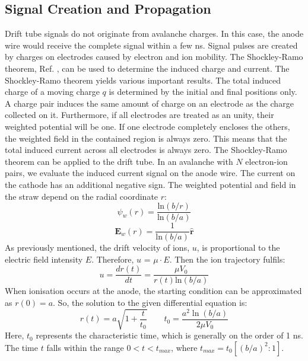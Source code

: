 \subsection{Signal Creation and Propagation}
Drift tube signals do not originate from avalanche charges. In this case, the anode wire would 
receive the complete signal within a few ns. Signal pulses are created by charges on electrodes 
caused by electron and ion mobility. The Shockley-Ramo theorem, Ref. \cite{kola}, can be 
used to determine the induced charge and current. 
The Shockley-Ramo theorem yields various important results. The total induced charge of a moving charge 
$q$ is determined by the initial and final positions only.  A charge pair induces the same amount of 
charge on an electrode as the charge collected on it. Furthermore, if all electrodes are treated as 
an unity, their weighted potential will be one. 
If one electrode completely encloses the others, the weighted field in the contained region is always zero. 
This means that the total induced current across all electrodes is always zero. The Shockley-Ramo theorem can 
be applied to the drift tube. In an avalanche with $N$ electron-ion pairs, we evaluate the induced current 
signal on the anode wire. The current on the cathode has an additional negative sign. The weighted 
potential and field in the straw depend on the radial coordinate $r$:
\begin{equation}
    \psi_w(r)=\frac{\text{ln}(b/r)}{\text{ln}(b/a)}
\end{equation}
\begin{equation}
    \textbf{E}_w(r)=\frac{1}{\text{ln}(b/a)}\hat{\textbf{r}}
\end{equation}
As previously mentioned, the drift velocity of ions, $u$, is proportional to the electric field intensity $E$. Therefore, $u$ = $\mu \cdot E$. 
Then the ion trajectory fulfils:
\begin{equation}
    u=\frac{dr(t)}{dt}=\frac{\mu V_0}{r(t)\text{ln}(b/a)}
\end{equation}
When ionisation occurs at the anode, the starting condition can be approximated as $r(0) = a$. So, the solution to the given differential equation is:
 \begin{equation}
    r(t)=a \sqrt{1+\frac{t}{t_0}} \qquad t_0=\frac{a^2 \ln (b / a)}{2 \mu V_0}
    \end{equation}
Here, $t_0$ represents the characteristic time, which is generally on the order of 1 ns. 
The time $t$ falls within the range $0 < t < t_{max}$, where $t_{max} = t_0 [(b/a)^2: 1]$. 
